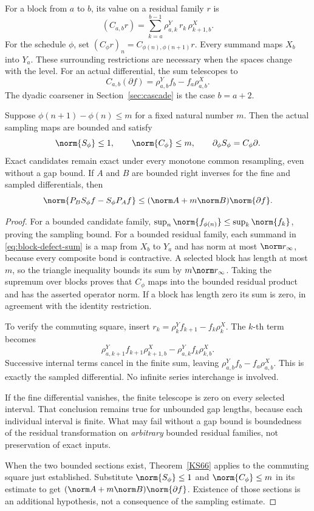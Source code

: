 For a block from \(a\) to \(b\), its value on a residual family \(r\) is
\begin{equation}\label{eq:block-defect-sum}
 (C_{a,b}r)=\sum_{k=a}^{b-1}
 \rho^Y_{a,k}\,r_k\,\rho^X_{k+1,b}.
\end{equation}
For the schedule \(\phi\), set \((C_\phi r)_n=C_{\phi(n),\phi(n+1)}r\). Every summand maps \(X_b\) into \(Y_a\). These surrounding restrictions are necessary when the spaces change with the level. For an actual differential, the sum telescopes to
\[
 C_{a,b}(\partial f)=\rho^Y_{a,b}f_b-f_a\rho^X_{a,b}.
\]
The dyadic coarsener in Section~\ref{sec:cascade} is the case \(b=a+2\).

\begin{theorem}\label{KS67}
Suppose \(\phi(n+1)-\phi(n)\le m\) for a fixed natural number \(m\). Then the actual sampling maps are bounded and satisfy
\[
 \norm{S_\phi}\le1,\qquad \norm{C_\phi}\le m,
 \qquad \partial_\phi S_\phi=C_\phi\partial.
\]
Exact candidates remain exact under every monotone common resampling, even without a gap bound. If \(A\) and \(B\) are bounded right inverses for the fine and sampled differentials, then
\[
 \norm{P_BS_\phi f-S_\phi P_Af}
 \le(\norm A+m\norm B)\norm{\partial f}.
\]
\end{theorem}
\begin{proof}
For a bounded candidate family, \(\sup_n\norm{f_{\phi(n)}}\le\sup_k\norm{f_k}\), proving the sampling bound. For a bounded residual family, each summand in \eqref{eq:block-defect-sum} is a map from \(X_b\) to \(Y_a\) and has norm at most \(\norm r_\infty\), because every composite bond is contractive. A selected block has length at most \(m\), so the triangle inequality bounds its sum by \(m\norm r_\infty\). Taking the supremum over blocks proves that \(C_\phi\) maps into the bounded residual product and has the asserted operator norm. If a block has length zero its sum is zero, in agreement with the identity restriction.

To verify the commuting square, insert
\(r_k=\rho^Y_kf_{k+1}-f_k\rho^X_k\). The \(k\)-th term becomes
\[
 \rho^Y_{a,k+1}f_{k+1}\rho^X_{k+1,b}
 -\rho^Y_{a,k}f_k\rho^X_{k,b}.
\]
Successive internal terms cancel in the finite sum, leaving \(\rho^Y_{a,b}f_b-f_a\rho^X_{a,b}\). This is exactly the sampled differential. No infinite series interchange is involved.

If the fine differential vanishes, the finite telescope is zero on every selected interval. That conclusion remains true for unbounded gap lengths, because each individual interval is finite. What may fail without a gap bound is boundedness of the residual transformation on \emph{arbitrary} bounded residual families, not preservation of exact inputs.

When the two bounded sections exist, Theorem~\ref{KS66} applies to the commuting square just established. Substitute \(\norm{S_\phi}\le1\) and \(\norm{C_\phi}\le m\) in its estimate to get \((\norm A+m\norm B)\norm{\partial f}\). Existence of those sections is an additional hypothesis, not a consequence of the sampling estimate.
\end{proof}
